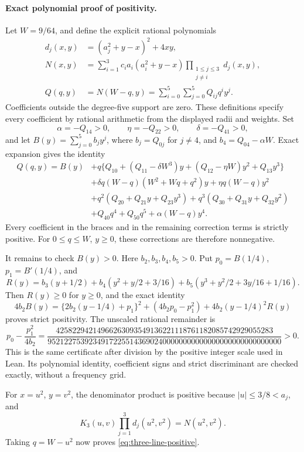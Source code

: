 \paragraph{Exact polynomial proof of positivity.}
Let \(W=9/64\), and define the explicit rational polynomials
\begin{align*}
 d_j(x,y)&=(a_j^2+y-x)^2+4xy,\\
 N(x,y)&=\sum_{i=1}^3 c_i a_i(a_i^2+y-x)
           \prod_{\substack{1\le j\le3\\j\ne i}}d_j(x,y),\\
 Q(q,y)&=N(W-q,y)=\sum_{i=0}^5\sum_{j=0}^5Q_{ij}q^iy^j.
\end{align*}
Coefficients outside the degree-five support are zero. These definitions
specify every coefficient by rational arithmetic from the displayed
radii and weights.
Set
\[
 \alpha=-Q_{14}>0,\qquad \eta=-Q_{22}>0,\qquad\delta=-Q_{41}>0,
\]
and let \(B(y)=\sum_{j=0}^5b_jy^j\), where \(b_j=Q_{0j}\) for
\(j\ne4\), and \(b_4=Q_{04}-\alpha W\).
Exact expansion gives the identity
\begin{align*}
 Q(q,y)=B(y)
 &+q\{Q_{10}+(Q_{11}-\delta W^3)y
                   +(Q_{12}-\eta W)y^2+Q_{13}y^3\}\\
 &+\delta q(W-q)(W^2+Wq+q^2)y+\eta q(W-q)y^2\\
 &+q^2(Q_{20}+Q_{21}y+Q_{23}y^3)
       +q^3(Q_{30}+Q_{31}y+Q_{32}y^2)\\
 &+Q_{40}q^4+Q_{50}q^5+\alpha(W-q)y^4.
\end{align*}
Every coefficient in the braces and in the remaining correction terms
is strictly positive. For \(0\le q\le W\), \(y\ge0\), these corrections
are therefore nonnegative.

It remains to check \(B(y)>0\). Here \(b_2,b_3,b_4,b_5>0\).
Put \(p_0=B(1/4)\), \(p_1=B'(1/4)\), and
\[
 R(y)=b_3(y+1/2)+b_4(y^2+y/2+3/16)
             +b_5(y^3+y^2/2+3y/16+1/16).
\]
Then \(R(y)\ge0\) for \(y\ge0\), and the exact identity
\[
 4b_2B(y)=\{2b_2(y-1/4)+p_1\}^2
      +(4b_2p_0-p_1^2)+4b_2(y-1/4)^2R(y)
\]
proves strict positivity. The unscaled rational remainder is
\[
 p_0-\frac{p_1^2}{4b_2}
 =\frac{42582294214966263093549136221118761182085742929055283}
 {952122753923491722551436902400000000000000000000000000000}>0.
\]
This is the same certificate after division by the positive integer
scale used in Lean. Its polynomial identity, coefficient signs and
strict discriminant are checked exactly, without a frequency grid.

For \(x=u^2\), \(y=v^2\), the denominator product is positive because
\(|u|\le3/8<a_j\), and
\[
 K_3(u,v)\prod_{j=1}^3 d_j(u^2,v^2)=N(u^2,v^2).
\]
Taking \(q=W-u^2\) now proves \eqref{eq:three-line-positive}.

